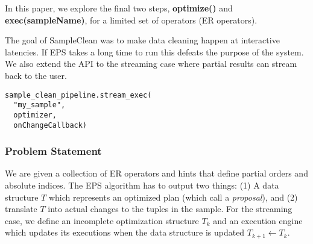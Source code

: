 In this paper, we explore the final two steps, \textbf{optimize()} and \textbf{exec(sampleName)}, 
for a limited set of operators (ER operators).

The goal of SampleClean was to make data cleaning happen at interactive latencies. 
If EPS takes a long time to run this defeats the purpose of the system.
We also extend the API to the streaming case where partial results can stream back to the user.

\begin{lstlisting}
sample_clean_pipeline.stream_exec(
  "my_sample", 
  optimizer,
  onChangeCallback)
\end{lstlisting}

\subsubsection{Problem Statement}
We are given a collection of ER operators and hints that define partial orders and absolute indices.
The EPS algorithm has to output two things: (1) A data structure $T$ which represents an optimized plan (which call a \emph{proposal}), and
(2) translate $T$ into actual changes to the tuples in the sample.
For the streaming case, we define an incomplete optimization structure $T_k$ and an execution engine which updates its executions when the data
structure is updated $T_{k+1}\leftarrow T_k$. 











